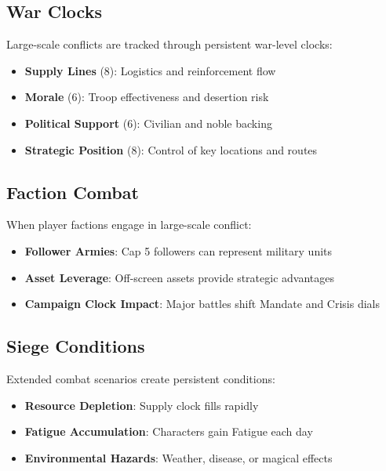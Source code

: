 \subsection*{War Clocks}

Large-scale conflicts are tracked through persistent war-level clocks:

\begin{itemize}
    \item \textbf{Supply Lines} (8): Logistics and reinforcement flow
    \item \textbf{Morale} (6): Troop effectiveness and desertion risk
    \item \textbf{Political Support} (6): Civilian and noble backing
    \item \textbf{Strategic Position} (8): Control of key locations and routes
\end{itemize}

\subsection*{Faction Combat}

When player factions engage in large-scale conflict:

\begin{itemize}
    \item \textbf{Follower Armies}: Cap 5 followers can represent military units
    \item \textbf{Asset Leverage}: Off-screen assets provide strategic advantages
    \item \textbf{Campaign Clock Impact}: Major battles shift Mandate and Crisis dials
\end{itemize}

\subsection*{Siege Conditions}

Extended combat scenarios create persistent conditions:

\begin{itemize}
    \item \textbf{Resource Depletion}: Supply clock fills rapidly
    \item \textbf{Fatigue Accumulation}: Characters gain Fatigue each day
    \item \textbf{Environmental Hazards}: Weather, disease, or magical effects
\end{itemize}

